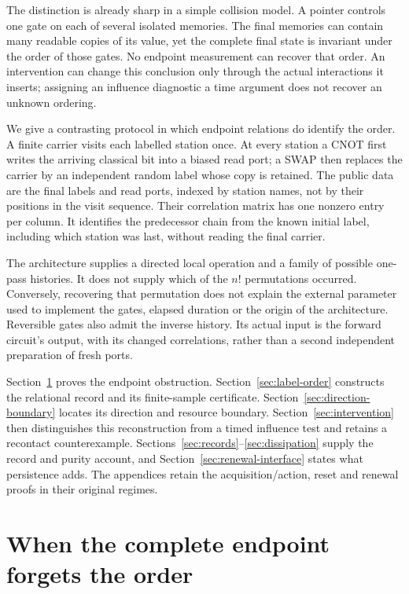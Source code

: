 \documentclass[12pt,a4paper]{article}
\begin{document}
The distinction is already sharp in a simple collision model.
A pointer controls one gate on each of several isolated memories.
The final memories can contain many readable copies of its value, yet
the complete final state is invariant under the order of those gates.
No endpoint measurement can recover that order.
An intervention can change this conclusion only through the actual
interactions it inserts; assigning an influence diagnostic a time
argument does not recover an unknown ordering.

We give a contrasting protocol in which endpoint relations do identify
the order. A finite carrier visits each labelled station once.
At every station a CNOT first writes the arriving classical bit into a
biased read port; a SWAP then replaces the carrier by an independent
random label whose copy is retained. The public data are the final
labels and read ports, indexed by station names, not by their positions
in the visit sequence. Their correlation matrix has one nonzero
entry per column. It identifies the predecessor chain from the known
initial label, including which station was last, without reading the
final carrier.

The architecture supplies a directed local operation and a family of
possible one-pass histories. It does not supply which of the $n!$
permutations occurred. Conversely, recovering that permutation does
not explain the external parameter used to implement the gates, elapsed
duration or the origin of the architecture. Reversible gates also admit
the inverse history. Its actual input is the forward circuit's output,
with its changed correlations, rather than a second independent
preparation of fresh ports.

Section~\ref{sec:order-obstruction} proves the endpoint obstruction.
Section~\ref{sec:label-order} constructs the relational record and its
finite-sample certificate. Section~\ref{sec:direction-boundary} locates
its direction and resource boundary. Section~\ref{sec:intervention}
then distinguishes this reconstruction from a timed influence test and
retains a recontact counterexample. Sections~\ref{sec:records}--\ref{sec:dissipation}
supply the record and purity account, and
Section~\ref{sec:renewal-interface} states what persistence adds.
The appendices retain the acquisition/action, reset and renewal
proofs in their original regimes.

\section{When the complete endpoint forgets the order}
\label{sec:order-obstruction}
\end{document}
